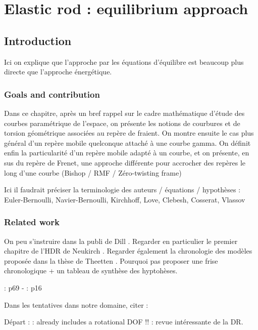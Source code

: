 \chapter{Elastic rod : equilibrium approach}

\section{Introduction}
Ici on explique que l'approche par les équations d'équilibre est beaucoup plus directe que l'approche énergétique.

\subsection{Goals and contribution}
Dans ce chapitre, après un bref rappel sur le cadre mathématique d'étude des courbes paramétrique de l'espace, on présente les notions de courbures et de torsion géométrique associées au repère de fraient. On montre ensuite le cas plus général d'un repère mobile quelconque attaché à une courbe gamma. On définit enfin la particularité d'un repère mobile adapté à un courbe, et on présente, en sus du repère de Frenet, une approche différente pour accrocher des repères le long d'une courbe (Bishop / RMF / Zéro-twisting frame)

Ici il faudrait préciser la terminologie des auteurs / équations / hypothèses :
Euler-Bernoulli, Navier-Bernoulli, Kirchhoff, Love, Clebesh, Cosserat, Vlassov

\subsection{Related work}
On peu s'instruire dans la publi de Dill \cite{Dill1992}.
Regarder en particulier le premier chapitre de l'HDR de Neukirch \cite{Neukirch2009}.
Regarder également la chronologie des modèles proposée dans la thèse de Theetten \cite{Theetten2007}.
Pourquoi pas proposer une frise chronologique + un tableau de synthèse des hyptohèses.

\cite{Dill1992}
\citet{Neukirch2009}
\cite{Adriaenssens1999}
\cite{Hoogenboom2006}
\cite{Lang2009}
\cite{Spillmann2008}
\cite{Antman2005}

\cite{Neukirch2009} : p69 - \cite{Dill1992} : p16

Dans les tentatives dans notre domaine, citer :

Départ :
\cite{Day1965} : already includes a rotational DOF !!
\cite{Wakefield1980}
\cite{Barnes1999} : revue intéressante de la DR.

